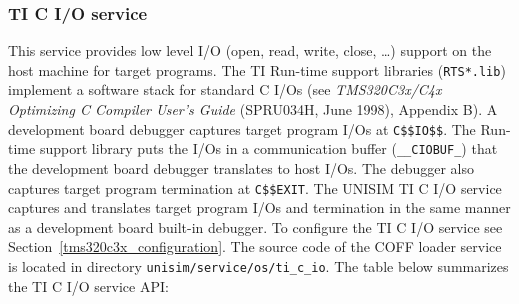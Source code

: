 \newpage
\subsubsection{TI C I/O service}
\label{tms320c3x_ti_c_io}

This service provides low level I/O (open, read, write, close, \ldots) support on the host machine for target programs.
The TI Run-time support libraries (\texttt{RTS*.lib}) implement a software stack for standard C I/Os (see \textit{TMS320C3x/C4x Optimizing C Compiler User’s Guide} (SPRU034H, June 1998), Appendix B).
A development board debugger captures target program I/Os at \texttt{C\$\$IO\$\$}.
The Run-time support library puts the I/Os in a communication buffer (\texttt{\_\_CIOBUF\_}) that the development board debugger translates to host I/Os.
The debugger also captures target program termination at \texttt{C\$\$EXIT}.
The UNISIM TI C I/O service captures and translates target program I/Os and termination in the same manner as a development board built-in debugger.
To configure the TI C I/O service see Section~\ref{tms320c3x_configuration}.
The source code of the COFF loader service is located in directory \texttt{unisim/service/os/ti\_c\_io}.
\noindent The table below summarizes the TI C I/O service API:

